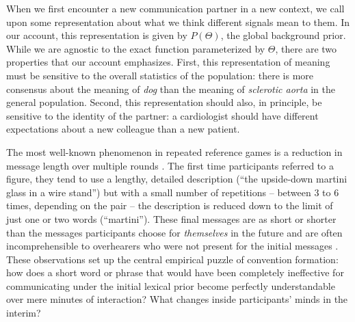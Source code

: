 

When we first encounter a new communication partner in a new context, we call upon some representation about what we think different signals mean to them. 
In our account, this representation is given by $P(\Theta)$, the global background prior.
While we are agnostic to the exact function parameterized by $\Theta$, there are two properties that our account emphasizes.
First, this representation of meaning must be sensitive to the overall statistics of the population: there is more consensus about the meaning of \emph{dog} than the meaning of \emph{sclerotic aorta} in the general population. 
Second, this representation should also, in principle, be sensitive to the identity of the partner: a cardiologist should have different expectations about a new colleague than a new patient.

The most well-known phenomenon in repeated reference games is a reduction in message length over multiple rounds . 
The first time participants referred to a figure, they tend to use a lengthy, detailed description (``the upside-down martini glass in a wire stand'') but with a small number of repetitions -- between 3 to 6 times, depending on the pair -- the description is reduced down to the limit of just one or two words (``martini''). 
These final messages are as short or shorter than the messages participants choose for \emph{themselves} in the future   and are often incomprehensible to overhearers who were not present for the initial messages \cite{SchoberClark89_Overhearers}.
These observations set up the central empirical puzzle of convention formation: how does a short word or phrase that would have been completely ineffective for communicating under the initial lexical prior become perfectly understandable over mere minutes of interaction? What changes inside participants' minds in the interim? 

